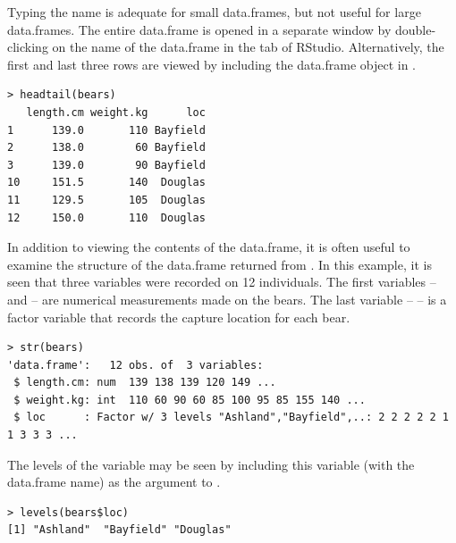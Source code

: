 \documentclass[10pt,openany]{book}\usepackage[]{graphicx}\usepackage[]{color}
\makeatletter
\newenvironment{kframe}{%
 \def\at@end@of@kframe{}%
 \ifinner\ifhmode%
  \def\at@end@of@kframe{\end{minipage}}%
  \begin{minipage}{\columnwidth}%
 \fi\fi%
 \def\FrameCommand##1{\hskip\@totalleftmargin \hskip-\fboxsep
 \colorbox{shadecolor}{##1}\hskip-\fboxsep
     \hskip-\linewidth \hskip-\@totalleftmargin \hskip\columnwidth}%
 \MakeFramed {\advance\hsize-\width
   \@totalleftmargin\z@ \linewidth\hsize
   \@setminipage}}%
 {\par\unskip\endMakeFramed%
 \at@end@of@kframe}
\newenvironment{knitrout}{}{} %
\makeatother
\begin{document}
Typing the name is adequate for small data.frames, but not useful for large data.frames.  The entire data.frame is opened in a separate window by double-clicking on the name of the data.frame in the  tab of RStudio.  Alternatively, the first and last three rows are viewed by including the data.frame object in .
\begin{knitrout}
\color{fgcolor}\begin{kframe}
\begin{verbatim}
> headtail(bears)
   length.cm weight.kg      loc
1      139.0       110 Bayfield
2      138.0        60 Bayfield
3      139.0        90 Bayfield
10     151.5       140  Douglas
11     129.5       105  Douglas
12     150.0       110  Douglas
\end{verbatim}
\end{kframe}
\end{knitrout}

In addition to viewing the contents of the data.frame, it is often useful to examine the structure of the data.frame returned from .  In this example, it is seen that three variables were recorded on 12 individuals.  The first variables --  and  -- are numerical measurements made on the bears.  The last variable --  -- is a factor variable that records the capture location for each bear.
\begin{knitrout}
\color{fgcolor}\begin{kframe}
\begin{verbatim}
> str(bears)
'data.frame':	12 obs. of  3 variables:
 $ length.cm: num  139 138 139 120 149 ...
 $ weight.kg: int  110 60 90 60 85 100 95 85 155 140 ...
 $ loc      : Factor w/ 3 levels "Ashland","Bayfield",..: 2 2 2 2 2 1 1 3 3 3 ...
\end{verbatim}
\end{kframe}
\end{knitrout}
The levels of the  variable may be seen by including this variable (with the data.frame name) as the argument to .
\begin{knitrout}
\color{fgcolor}\begin{kframe}
\begin{verbatim}
> levels(bears$loc)
[1] "Ashland"  "Bayfield" "Douglas" 
\end{verbatim}
\end{kframe}
\end{knitrout}
\end{document}
